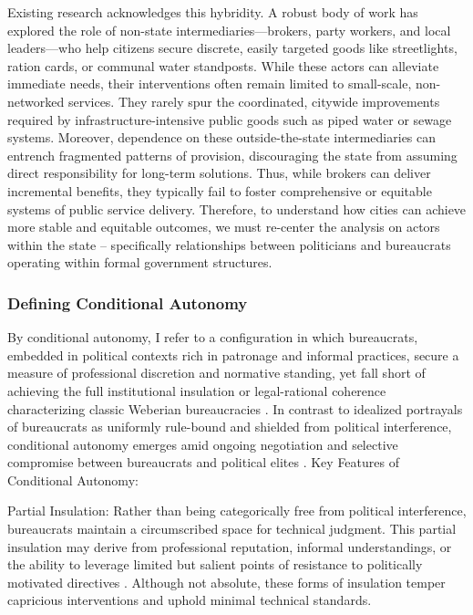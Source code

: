 Existing research acknowledges this hybridity. A robust body of work has explored the role of non-state intermediaries—brokers, party workers, and local leaders—who help citizens secure discrete, easily targeted goods like streetlights, ration cards, or communal water standposts\citep{auerbach_demanding_2019, krishna_politics_2007, pande_can_2011}. While these actors can alleviate immediate needs, their interventions often remain limited to small-scale, non-networked services. They rarely spur the coordinated, citywide improvements required by infrastructure-intensive public goods such as piped water or sewage systems. Moreover, dependence on these outside-the-state intermediaries can entrench fragmented patterns of provision, discouraging the state from assuming direct responsibility for long-term solutions. Thus, while brokers can deliver incremental benefits, they typically fail to foster comprehensive or equitable systems of public service delivery. Therefore, to understand how cities can achieve more stable and equitable outcomes, we must re-center the analysis on actors within the state -- specifically relationships between politicians and bureaucrats operating within formal government structures.


\subsubsection{Defining Conditional Autonomy}

By conditional autonomy, I refer to a configuration in which bureaucrats, embedded in political contexts rich in patronage and informal practices, secure a measure of professional discretion and normative standing, yet fall short of achieving the full institutional insulation or legal-rational coherence characterizing classic Weberian bureaucracies \citep{weber_max_1946, evans_government_1996}. In contrast to idealized portrayals of bureaucrats as uniformly rule-bound and shielded from political interference, conditional autonomy emerges amid ongoing negotiation and selective compromise between bureaucrats and political elites \citep{migdal_strong_1988, heller_labor_1991}. Key Features of Conditional Autonomy:

Partial Insulation:
Rather than being categorically free from political interference, bureaucrats maintain a circumscribed space for technical judgment. This partial insulation may derive from professional reputation, informal understandings, or the ability to leverage limited but salient points of resistance to politically motivated directives \citep{grindle_divergent_1997, tsai_accountability_2012}. Although not absolute, these forms of insulation temper capricious interventions and uphold minimal technical standards.


